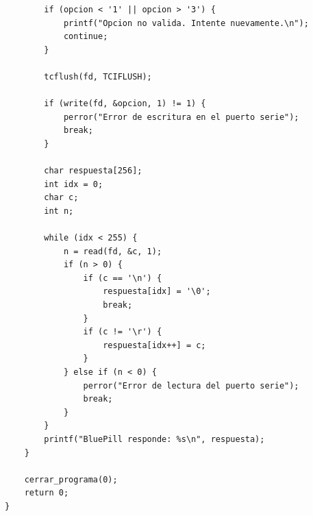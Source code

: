 \documentclass{plantilla}
\begin{document}
\begin{lstlisting}
        if (opcion < '1' || opcion > '3') {
            printf("Opcion no valida. Intente nuevamente.\n");
            continue;
        }

        tcflush(fd, TCIFLUSH);

        if (write(fd, &opcion, 1) != 1) {
            perror("Error de escritura en el puerto serie");
            break;
        }

        char respuesta[256];
        int idx = 0;
        char c;
        int n;

        while (idx < 255) {
            n = read(fd, &c, 1);
            if (n > 0) {
                if (c == '\n') {
                    respuesta[idx] = '\0';
                    break;
                }
                if (c != '\r') {
                    respuesta[idx++] = c;
                }
            } else if (n < 0) {
                perror("Error de lectura del puerto serie");
                break;
            }
        }
        printf("BluePill responde: %s\n", respuesta);
    }

    cerrar_programa(0);
    return 0;
}
\end{lstlisting}
\end{document}
